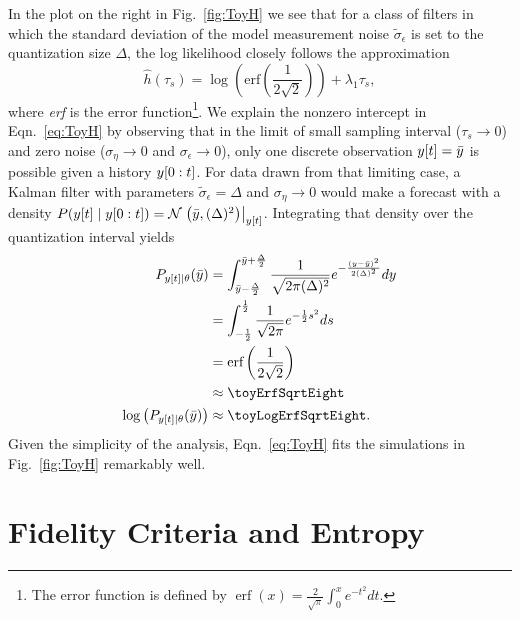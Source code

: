 In the plot on the right in Fig.~\ref{fig:ToyH} we see that for a
class of filters in which the standard deviation of the model
measurement noise $\tilde \sigma_\epsilon$ is set to the quantization
size $\Delta$, the log likelihood closely follows the approximation
\begin{equation}
  \label{eq:ToyH}
  \hat h(\tau_s) = \log\left(\text{erf}\left(\frac{1}{2\sqrt{2}}\right)\right)
  + \lambda_1 \tau_s,
\end{equation}
where \emph{erf} is the error function\footnote{The error function is
  defined by $\operatorname{erf}(x) = \frac{2}{\sqrt{\pi}}\int_0^x
  e^{-t^2} dt$.}.  We explain the nonzero intercept in
Eqn.~\eqref{eq:ToyH} by observing that in the limit of small sampling
interval ($\tau_s \rightarrow 0$) and zero noise ($\sigma_\eta
\rightarrow 0$ and $\sigma_\epsilon \rightarrow 0$), only one discrete
observation ${y}{[t]}=\bar y$ is possible given a history
$y[0:t]$.  For data drawn from that limiting case, a Kalman
filter with parameters $\tilde \sigma_\epsilon = \Delta$ and
$\sigma_\eta \rightarrow 0$ would make a forecast with a density
$P({y}{[t]}\mid y[0:t]) = {\mathcal{N}}\left.\left(\bar
  y,(\Delta)^2\right)\right|_{{y}{[t]}}$.  Integrating that density over the
quantization interval yields
 \begin{align*}
   P_{\ti{y}{t}\given \theta}(\bar y) &= \int_{\bar y -
     \frac{\Delta}{2}}^{\bar y + \frac{\Delta}{2}} \frac{1}{\sqrt{2\pi
       (\Delta)^2}}e^{-\frac{(y-\bar
       y)^2}{2(\Delta)^2}} dy\\
   &= \int_{-\frac{1}{2}}^{\frac{1}{2}} \frac{1}{\sqrt{2\pi
     }}e^{-\frac{1}{2}s^2} ds\\
   &= \text{erf} \left( \frac{1}{2\sqrt{2}}\right) \\
   &\approx \toyErfSqrtEight \\
   \log \left( P_{\ti{y}{t}\given \theta}(\bar y) \right) &\approx \toyLogErfSqrtEight.
 \end{align*}
Given the simplicity of the analysis, Eqn.~\eqref{eq:ToyH} fits the
simulations in Fig.~\ref{fig:ToyH} remarkably well.


\section{Fidelity Criteria and Entropy}
\label{sec:fidelity}

